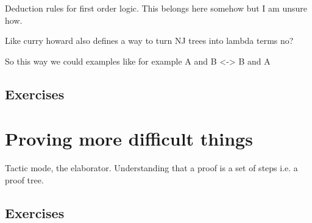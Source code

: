 Deduction rules for first order logic. This belongs here somehow but I am unsure how. 

Like curry howard also defines a way to turn NJ trees into lambda terms no?

So this way we could examples like for example A and B <-> B and A

\subsection{Exercises}

\section{Proving more difficult things}

Tactic mode, the elaborator. Understanding that a proof is a set of steps i.e. a proof tree.

\subsection{Exercises}


